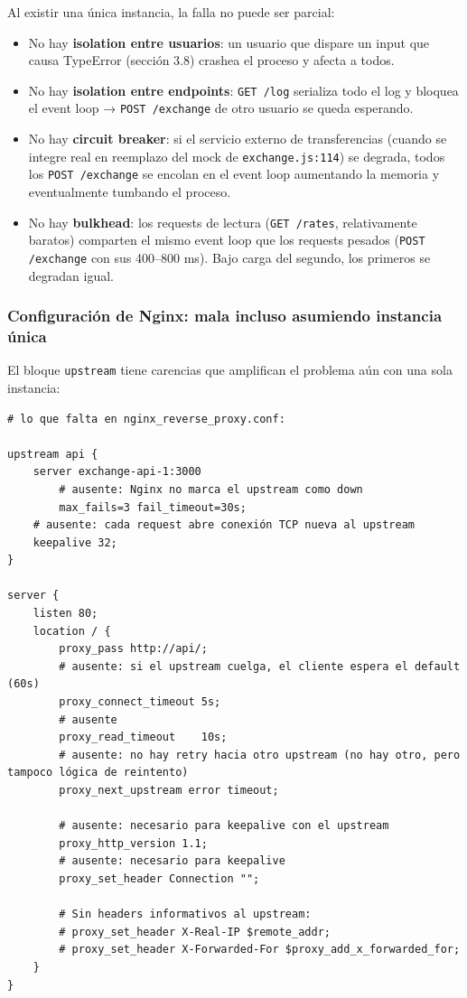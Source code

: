 Al existir una única instancia, la falla no puede ser parcial:
\begin{itemize}
    \item No hay \textbf{isolation entre usuarios}: un usuario que dispare un input que causa TypeError (sección 3.8) crashea el proceso y afecta a todos.
    \item No hay \textbf{isolation entre endpoints}: \texttt{GET /log} serializa todo el log y bloquea el event loop → \texttt{POST /exchange} de otro usuario se queda esperando.
    \item No hay \textbf{circuit breaker}: si el servicio externo de transferencias (cuando se integre real en reemplazo del mock de \texttt{exchange.js:114}) se degrada, todos los \texttt{POST /exchange} se encolan en el event loop aumentando la memoria y eventualmente tumbando el proceso.
    \item No hay \textbf{bulkhead}: los requests de lectura (\texttt{GET /rates}, relativamente baratos) comparten el mismo event loop que los requests pesados (\texttt{POST /exchange} con sus 400–800 ms). Bajo carga del segundo, los primeros se degradan igual.
\end{itemize}

\subsubsection{Configuración de Nginx: mala incluso asumiendo instancia única}

El bloque \texttt{upstream} tiene carencias que amplifican el problema aún con una sola instancia:

\begin{verbatim}
# lo que falta en nginx_reverse_proxy.conf:

upstream api {
    server exchange-api-1:3000
        # ausente: Nginx no marca el upstream como down
        max_fails=3 fail_timeout=30s;
    # ausente: cada request abre conexión TCP nueva al upstream
    keepalive 32;
}

server {
    listen 80;
    location / {
        proxy_pass http://api/;
        # ausente: si el upstream cuelga, el cliente espera el default (60s)
        proxy_connect_timeout 5s;
        # ausente
        proxy_read_timeout    10s;
        # ausente: no hay retry hacia otro upstream (no hay otro, pero tampoco lógica de reintento)
        proxy_next_upstream error timeout;

        # ausente: necesario para keepalive con el upstream
        proxy_http_version 1.1;
        # ausente: necesario para keepalive
        proxy_set_header Connection "";

        # Sin headers informativos al upstream:
        # proxy_set_header X-Real-IP $remote_addr;
        # proxy_set_header X-Forwarded-For $proxy_add_x_forwarded_for;
    }
}
\end{verbatim}

